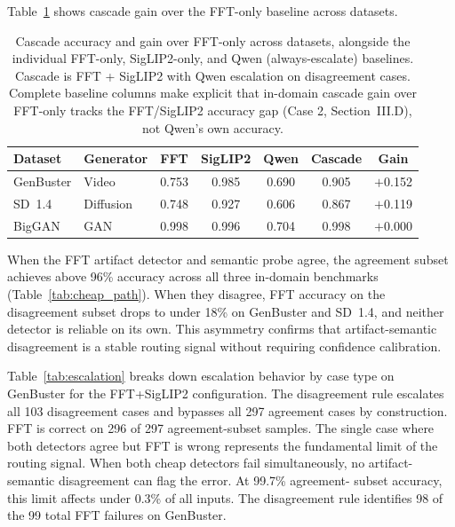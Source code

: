 \documentclass{ieeeaccess}
\begin{document}
Table~\ref{tab:crossdataset} shows cascade gain over the FFT-only baseline across datasets.

\begin{table}[h]
\centering
\caption{Cascade accuracy and gain over FFT-only across datasets, alongside the
individual FFT-only, SigLIP2-only, and Qwen (always-escalate) baselines. Cascade is
FFT + SigLIP2 with Qwen escalation on disagreement cases. Complete baseline columns
make explicit that in-domain cascade gain over FFT-only tracks the FFT/SigLIP2
accuracy gap (Case 2, Section~III.D), not Qwen's own accuracy.}
\label{tab:crossdataset}
\footnotesize
\setlength{\tabcolsep}{3pt}
\begin{tabularx}{\columnwidth}{l l c c c c c}
\toprule
\textbf{Dataset} & \textbf{Generator} & \textbf{FFT} & \textbf{SigLIP2} & \textbf{Qwen} & \textbf{Cascade} & \textbf{Gain} \\
\midrule
GenBuster & Video     & 0.753 & 0.985 & 0.690 & 0.905 & $+$0.152 \\
SD~1.4    & Diffusion & 0.748 & 0.927 & 0.606 & 0.867 & $+$0.119 \\
BigGAN    & GAN       & 0.998 & 0.996 & 0.704 & 0.998 & $+$0.000 \\
\bottomrule
\end{tabularx}
\end{table}


When the FFT artifact detector and semantic probe agree, the agreement subset achieves
above 96\% accuracy across all three in-domain benchmarks (Table~\ref{tab:cheap_path}).
When they disagree, FFT accuracy on the disagreement subset drops to under 18\% on
GenBuster and SD~1.4, and neither detector is reliable on its own. This asymmetry
confirms that artifact-semantic disagreement is a stable routing signal without requiring
confidence calibration.

Table~\ref{tab:escalation} breaks down escalation behavior by case type on GenBuster for
the FFT+SigLIP2 configuration. The disagreement rule escalates all 103 disagreement cases
and bypasses all 297 agreement cases by construction. FFT is correct on 296 of 297
agreement-subset samples. The single case where both detectors agree but FFT is wrong
represents the fundamental limit of the routing signal. When both cheap detectors fail
simultaneously, no artifact-semantic disagreement can flag the error. At 99.7\% agreement-
subset accuracy, this limit affects under 0.3\% of all inputs. The disagreement rule
identifies 98 of the 99 total FFT failures on GenBuster.
\end{document}
